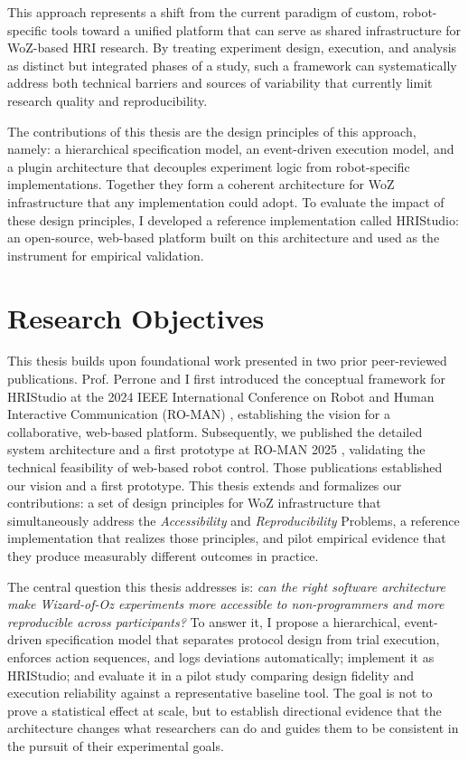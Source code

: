 This approach represents a shift from the current paradigm of custom, robot-specific tools toward a unified platform that can serve as shared infrastructure for WoZ-based HRI research. By treating experiment design, execution, and analysis as distinct but integrated phases of a study, such a framework can systematically address both technical barriers and sources of variability that currently limit research quality and reproducibility.

The contributions of this thesis are the design principles of this approach, namely: a hierarchical specification model, an event-driven execution model, and a plugin architecture that decouples experiment logic from robot-specific implementations. Together they form a coherent architecture for WoZ infrastructure that any implementation could adopt. To evaluate the impact of these design principles, I developed a reference implementation called HRIStudio: an open-source, web-based platform built on this architecture and used as the instrument for empirical validation.

\section{Research Objectives}

This thesis builds upon foundational work presented in two prior peer-reviewed publications. Prof. Perrone and I first introduced the conceptual framework for HRIStudio at the 2024 IEEE International Conference on Robot and Human Interactive Communication (RO-MAN) \cite{OConnor2024}, establishing the vision for a collaborative, web-based platform. Subsequently, we published the detailed system architecture and a first prototype at RO-MAN 2025 \cite{OConnor2025}, validating the technical feasibility of web-based robot control. Those publications established our vision and a first prototype. This thesis extends and formalizes our contributions: a set of design principles for WoZ infrastructure that simultaneously address the \textit{Accessibility} and \textit{Reproducibility} Problems, a reference implementation that realizes those principles, and pilot empirical evidence that they produce measurably different outcomes in practice.

The central question this thesis addresses is: \emph{can the right software architecture make Wizard-of-Oz experiments more accessible to non-programmers and more reproducible across participants?} To answer it, I propose a hierarchical, event-driven specification model that separates protocol design from trial execution, enforces action sequences, and logs deviations automatically; implement it as HRIStudio; and evaluate it in a pilot study comparing design fidelity and execution reliability against a representative baseline tool. The goal is not to prove a statistical effect at scale, but to establish directional evidence that the architecture changes what researchers can do and guides them to be consistent in the pursuit of their experimental goals.

